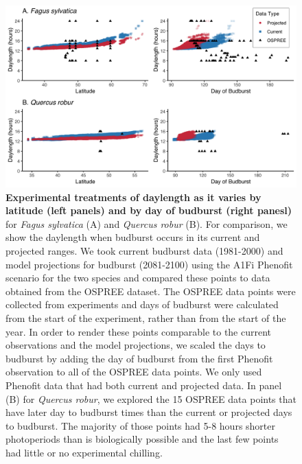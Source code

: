 \documentclass{article}
\begin{document}
\begin{figure}[p]
\includegraphics{..//..//analyses/photoperiod/figures/2D_actual_combined.png} 
\caption{\textbf{Experimental treatments of daylength as it varies by latitude (left panels) and by day of budburst (right panesl)} for \textit{Fagus sylvatica} (A) and \textit{Quercus robur} (B). For comparison, we show the daylength when budburst occurs in its current and projected ranges. We took current budburst data (1981-2000) and model projections for budburst (2081-2100) using the A1Fi Phenofit scenario \citep{duputie2015} for the two species and compared these points to data obtained from the OSPREE dataset. The OSPREE data points were collected from experiments and days of budburst were calculated from the start of the experiment, rather than from the start of the year. In order to render these points comparable to the current observations and the model projections, we scaled the days to budburst by adding the day of budburst from the first Phenofit observation to all of the OSPREE data points. We only used Phenofit data that had both current and projected data. In panel (B) for \textit{Quercus robur}, we explored the 15 OSPREE data points that have later day to budburst times than the current or projected days to budburst. The majority of those points had 5-8 hours shorter photoperiods than is biologically possible and the last few points had little or no experimental chilling.}%
 \label{fig:fagus}
 \end{figure}
 
\end{document}
